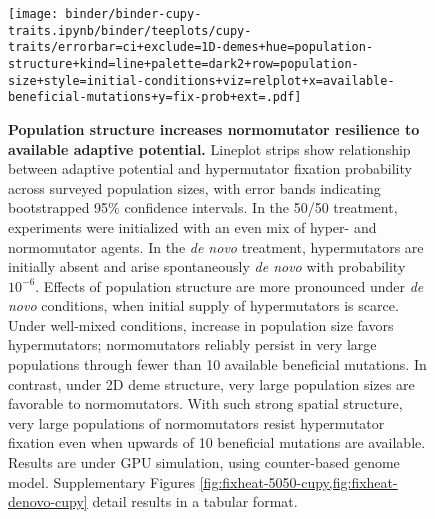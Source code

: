 \begin{figure}[h]
\begin{minipage}{\textwidth}
  \texttt{[image: binder/binder-cupy-traits.ipynb/binder/teeplots/cupy-traits/errorbar=ci+exclude=1D-demes+hue=population-structure+kind=line+palette=dark2+row=population-size+style=initial-conditions+viz=relplot+x=available-beneficial-mutations+y=fix-prob+ext=.pdf]}%
\end{minipage}

\begin{minipage}{\textwidth}
  \caption{%
    \textbf{Population structure increases normomutator resilience to available adaptive potential.}
    \footnotesize
    Lineplot strips show relationship between adaptive potential and hypermutator fixation probability across surveyed population sizes, with error bands indicating bootstrapped 95\% confidence intervals.
    In the 50/50 treatment, experiments were initialized with an even mix of hyper- and normomutator agents.
    In the \textit{de novo} treatment, hypermutators are initially absent and arise spontaneously \textit{de novo} with probability $10^{-6}$.
    Effects of population structure are more pronounced under \textit{de novo} conditions, when initial supply of hypermutators is scarce.
    Under well-mixed conditions, increase in population size favors hypermutators; normomutators reliably persist in very large populations through fewer than 10 available beneficial mutations.
    In contrast, under 2D deme structure, very large population sizes are favorable to normomutators.
    With such strong spatial structure, very large populations of normomutators resist hypermutator fixation even when upwards of 10 beneficial mutations are available.
    Results are under GPU simulation, using counter-based genome model.
    Supplementary Figures \cref{fig:fixheat-5050-cupy,fig:fixheat-denovo-cupy} detail results in a tabular format.
  }
  \label{fig:spatial-structure-combined}
\end{minipage}
\end{figure}
